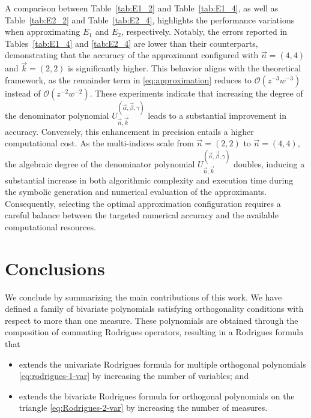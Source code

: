 \documentclass[11pt,reqno]{amsart}
\theoremstyle{definition}
\begin{document}
A comparison between Table~\ref{tab:E1_2} and Table~\ref{tab:E1_4}, as well as Table~\ref{tab:E2_2} and Table~\ref{tab:E2_4}, highlights the performance variations when approximating $E_1$ and $E_2$, respectively.  Notably, the errors reported in Tables~\ref{tab:E1_4} and \ref{tab:E2_4} are lower than their counterparts, demonstrating that the accuracy of the approximant configured with $\vec n=(4,4)$ and $\vec k = (2,2)$ is significantly higher. This behavior aligns with the theoretical framework, as the remainder term in \eqref{eq:approximation} reduces to $\mathcal{O}(z^{-3}w^{-3})$ instead of $\mathcal{O}(z^{-2}w^{-2})$. These experiments indicate that increasing the degree of the denominator polynomial $U_{\vec n,\vec k}^{(\vec\alpha,\vec\beta,\gamma)}$ leads to a substantial improvement in accuracy. Conversely, this enhancement in precision entails a higher computational cost. As the multi-indices scale from $\vec n=(2,2)$ to $\vec n=(4,4)$, the algebraic degree of the denominator polynomial $U_{\vec n,\vec k}^{(\vec\alpha,\vec\beta,\gamma)}$ doubles, inducing a substantial increase in both algorithmic complexity and execution time during the symbolic generation and numerical evaluation of the approximants. Consequently, selecting the optimal approximation configuration requires a careful balance between the targeted numerical accuracy and the available computational resources.

\section{Conclusions}\label{sec:conclusions}

We conclude by summarizing the main contributions of this work. We have defined a family of bivariate polynomials satisfying orthogonality conditions with respect to more than one measure. These polynomials are obtained through the composition of commuting Rodrigues operators, resulting in a Rodrigues formula that
\begin{itemize}
    \item extends the univariate Rodrigues formula for multiple orthogonal polynomials \eqref{eq:rodrigues-1-var} by increasing the number of variables; and
    \item extends the bivariate Rodrigues formula for orthogonal polynomials on the triangle \eqref{eq:Rodrigues-2-var} by increasing the number of measures.
\end{itemize}
\end{document}
